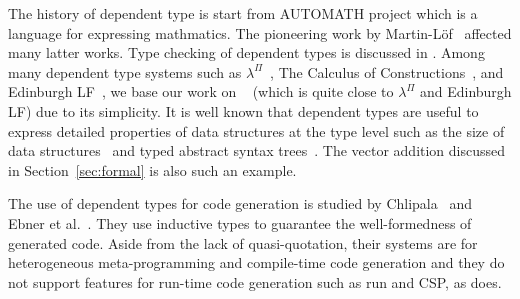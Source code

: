 The history of dependent type is start from AUTOMATH
project\cite{DeBruijnNicolaas1970AUTOMATH} which is a language for expressing
mathmatics. The pioneering work by
Martin-L\"{o}f~\cite{MartinLof1973Intuitionistic} affected many latter works.
Type checking of dependent types is discussed in
\cite{Cardelli1988Typechecking, Coquand1996Typechecking}.  Among many dependent
type systems such as $\lambda^\Pi$~\cite{MeyerReinhold1986Type}, The Calculus
of Constructions~\cite{Coquand1988CoC}, and Edinburgh
LF~\cite{HarperHonsellPlotkin1993Framework}, we base our work on
\LLF~\cite{attapl} (which is quite close to $\lambda^\Pi$ and Edinburgh LF) due
to its simplicity.  It is well known that dependent types are useful to express
detailed properties of data structures at the type level such as the size of
data structures~\cite{XiPfenning1998Eliminating} and typed abstract syntax
trees~\cite{LeijenMeijer1999DSEC, XiChenChen2003Guarded}. The vector addition
discussed in Section~\ref{sec:formal} is also such an example.






The use of dependent types for code generation is studied by
Chlipala~\cite{Chlipala2010Ur} and Ebner et
al.~\cite{EbnerUllrichRoeschAvigadMoura2017meta}. They use inductive types to
guarantee the well-formedness of generated code.  Aside from the lack of
quasi-quotation, their systems are for heterogeneous meta-programming and
compile-time code generation and they do not support features for run-time code
generation such as run and CSP, as \LMD{} does.


